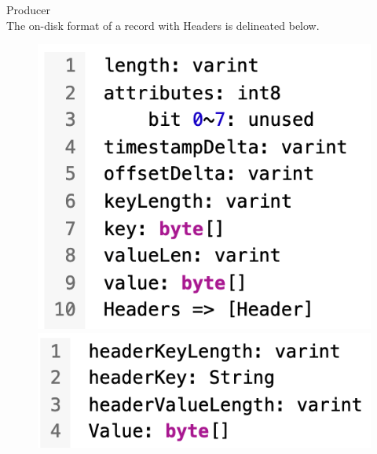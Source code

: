 \begin{frame}[plain,t]{Producer} %
     \\
    \vspace{2ex}
    The on-disk format of a record with Headers is delineated below.
    \begin{figure}[htbp]
        \centering
        \begin{minipage}[t]{0.48\textwidth}
            \centering
            \includegraphics[width=0.8\linewidth]{image/0303}
        \end{minipage}
        \begin{minipage}[t]{0.48\textwidth}
            \centering
            \includegraphics[width=0.8\linewidth]{image/0304}
        \end{minipage}
    \end{figure}
\end{frame}


